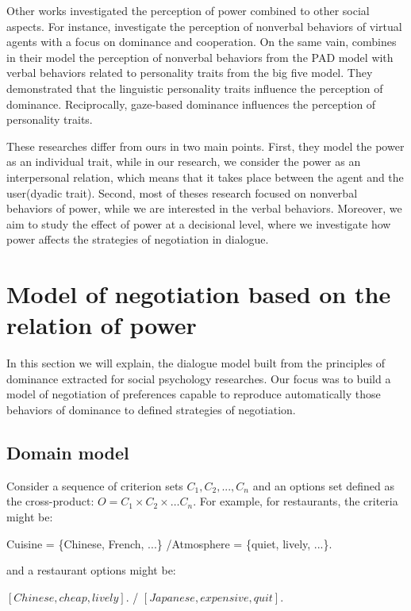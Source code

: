 \documentclass{llncs}
\begin{document}
	\par Other works investigated the perception of power combined to other social aspects. For instance,\cite{strassmann2016effect} investigate the perception of nonverbal behaviors of virtual agents with a focus on dominance and cooperation. On the same vain,  \cite{bee2010bossy} combines in their model the perception of nonverbal behaviors from the PAD model \cite{mehrabian1996analysis} with verbal behaviors related to personality traits from the big five model.
	 They demonstrated that the linguistic personality traits influence the perception of dominance. Reciprocally, gaze-based dominance influences the perception of personality traits.
	
	 
	These researches differ from ours in two main points. First, they model the power as an individual trait, while in our research, we consider the power as an interpersonal relation, which means that it takes place between the agent and the user(dyadic trait). 
	Second, most of theses research focused on nonverbal behaviors of power, while we are interested in the verbal behaviors. Moreover, we aim to study the effect of power at a decisional level, where we investigate how power affects the strategies of negotiation in dialogue.
	
	
	\section{Model of negotiation based on the relation of power}
	In this section we will explain, the dialogue model built from the principles of dominance extracted for social psychology researches. Our focus was to build a model of negotiation of preferences capable to reproduce automatically those behaviors of dominance to defined strategies of negotiation.

	\subsection{Domain model}
	Consider a sequence of criterion sets $C_1, C_2, ..., C_n$ and an options set defined as the cross-product:
	$O = C_1 \times C_2 \times \ldots C_n$.
	For example, for restaurants, the criteria might be:
	
	Cuisine = \{Chinese, French, ...\} /Atmosphere = \{quiet, lively, ...\}. 
	
	and a restaurant options might be: 
	
	$[Chinese, cheap, lively]$. / $[Japanese, expensive, quit]$.   
\end{document}
